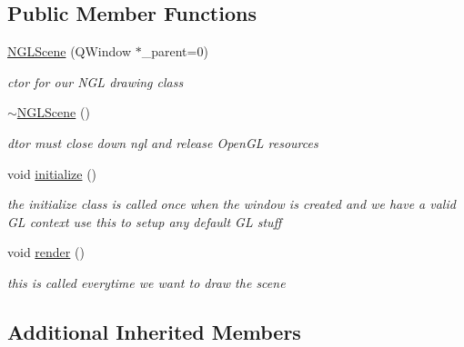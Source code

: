 \subsection*{Public Member Functions}
\begin{DoxyCompactItemize}
\item 
\hyperlink{class_n_g_l_scene_adbde5986bed766df177e33baa7fbb222}{N\+G\+L\+Scene} (Q\+Window $\ast$\+\_\+parent=0)
\begin{DoxyCompactList}\small\item\em ctor for our N\+G\+L drawing class \end{DoxyCompactList}\item 
\hypertarget{class_n_g_l_scene_abda05d130945833bfbb6bad8d619f7f5}{}\hyperlink{class_n_g_l_scene_abda05d130945833bfbb6bad8d619f7f5}{$\sim$\+N\+G\+L\+Scene} ()\label{class_n_g_l_scene_abda05d130945833bfbb6bad8d619f7f5}

\begin{DoxyCompactList}\small\item\em dtor must close down ngl and release Open\+G\+L resources \end{DoxyCompactList}\item 
\hypertarget{class_n_g_l_scene_a63e57fc201b639e51c6eed6ec3b6b992}{}void \hyperlink{class_n_g_l_scene_a63e57fc201b639e51c6eed6ec3b6b992}{initialize} ()\label{class_n_g_l_scene_a63e57fc201b639e51c6eed6ec3b6b992}

\begin{DoxyCompactList}\small\item\em the initialize class is called once when the window is created and we have a valid G\+L context use this to setup any default G\+L stuff \end{DoxyCompactList}\item 
\hypertarget{class_n_g_l_scene_a63905ed5bab957d8e2d5528f942feb42}{}void \hyperlink{class_n_g_l_scene_a63905ed5bab957d8e2d5528f942feb42}{render} ()\label{class_n_g_l_scene_a63905ed5bab957d8e2d5528f942feb42}

\begin{DoxyCompactList}\small\item\em this is called everytime we want to draw the scene \end{DoxyCompactList}\end{DoxyCompactItemize}
\subsection*{Additional Inherited Members}


